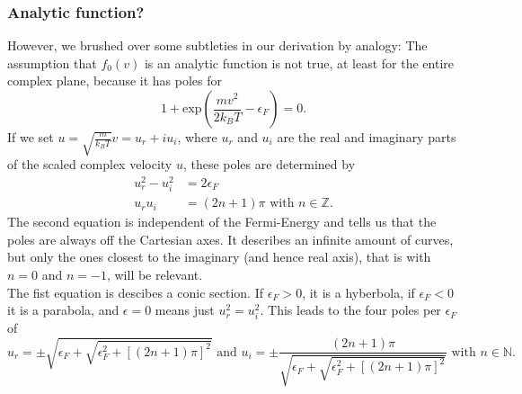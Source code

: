 \documentclass[physics,phd,nolot,nolof]{uccthesis}%
\begin{document}
\subsubsection{Analytic function?}
However, we brushed over some subtleties in our derivation by analogy: The assumption that $f_0(v)$ is an analytic function is not true, at least for the entire complex plane, because it has poles for
\begin{equation}
	1+\text{exp}(\frac{mv^2}{2k_BT}-\epsilon_F)=0.
	\label{eq:FDpoles}
\end{equation}
If we set $u=\sqrt{\frac{m}{k_BT}}v=u_r+iu_i$,
where $u_r$ and $u_i$ are the real and imaginary parts of the scaled complex velocity $u$,
these poles are determined by
\begin{equation}
	\begin{split}
	u_r^2-u_i^2&=2\epsilon_F\\
	u_r u_i&=(2n+1)\pi	
\text{ with } n\in\mathbb{Z}.
	\end{split}
	\label{eq:FDpoles3}
\end{equation}
The second equation is independent of the Fermi-Energy and tells us that the poles are always off the Cartesian axes. 
It describes an infinite amount of curves, but only the ones closest to the imaginary (and hence real axis), that is with $n=0$ and $n=-1$, will be relevant.\\
The fist equation is descibes a conic section. If $\epsilon_F>0$, it is a hyberbola, if $\epsilon_F<0$ it is a parabola, and $\epsilon=0$ means just $u_r^2=u_i^2$. 
This leads to the four poles per $\epsilon_F$ of
\begin{equation}
u_r=\pm\sqrt{\epsilon_F+\sqrt{\epsilon_F^2+[(2n+1)\pi]^2}} \text{ and }
u_i=\pm\frac{(2n+1)\pi}{\sqrt{\epsilon_F+\sqrt{\epsilon_F^2+[(2n+1)\pi]^2}}} 
\text{ with } n\in\mathbb{N}.
	\label{eq:FDpoles2}
\end{equation}
\end{document}
